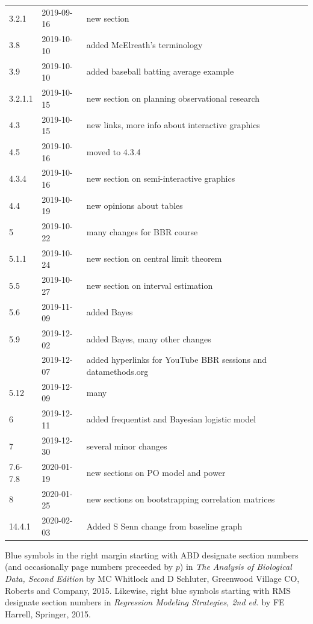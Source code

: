 \documentclass{report}
\begin{document}
\begin{center}
\begin{tabular}{lll}
3.2.1   & 2019-09-16 & new section\\
3.8     & 2019-10-10 & added McElreath's terminology\\
3.9     & 2019-10-10 & added baseball batting average example\\
3.2.1.1 & 2019-10-15 & new section on planning observational research\\
4.3     & 2019-10-15 & new links, more info about interactive graphics\\
4.5     & 2019-10-16 & moved to 4.3.4\\
4.3.4   & 2019-10-16 & new section on semi-interactive graphics\\
4.4     & 2019-10-19 & new opinions about tables\\
5       & 2019-10-22 & many changes for BBR course\\
5.1.1   & 2019-10-24 & new section on central limit theorem\\
5.5     & 2019-10-27 & new section on interval estimation\\
5.6     & 2019-11-09 & added Bayes\\
5.9     & 2019-12-02 & added Bayes, many other changes\\
        & 2019-12-07 & added hyperlinks for YouTube BBR sessions and datamethods.org\\
5.12    & 2019-12-09 & many\\
6       & 2019-12-11 & added frequentist and Bayesian logistic model\\
7       & 2019-12-30 & several minor changes\\
7.6-7.8 & 2020-01-19 & new sections on PO model and power\\
8       & 2020-01-25 & new sections on bootstrapping correlation matrices\\
14.4.1  & 2020-02-03 & Added S Senn change from baseline graph\\
\hline
\end{tabular}\end{center}
\else
\fi

Blue symbols in the right margin starting with ABD designate
section numbers (and occasionally page numbers preceeded by $p$)
in \emph{The Analysis of Biological Data, Second Edition} by MC Whitlock and D
Schluter, Greenwood Village CO, Roberts and Company, 2015.  Likewise, right
blue symbols starting with RMS designate section numbers in \emph{Regression
Modeling Strategies, 2nd ed.} by FE Harrell, Springer, 2015.
\end{document}
